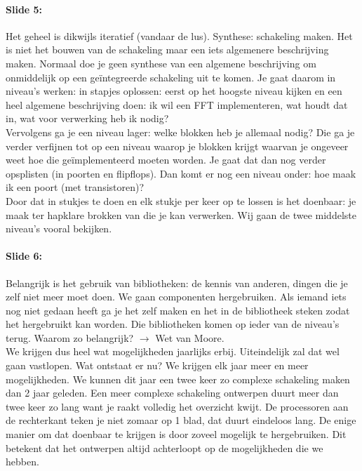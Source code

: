 \documentclass[10pt,a4paper]{book}
\begin{document}
\paragraph{Slide 5:} Het geheel is dikwijls iteratief (vandaar de lus). Synthese: schakeling maken. Het is niet het bouwen van de schakeling maar een iets algemenere beschrijving maken. Normaal doe je geen synthese van een algemene beschrijving om onmiddelijk op een ge\"integreerde schakeling uit te komen. Je gaat daarom in niveau's werken: in stapjes oplossen: eerst op het hoogste niveau kijken en een heel algemene beschrijving doen: ik wil een FFT implementeren, wat houdt dat in, wat voor verwerking heb ik nodig?\\ Vervolgens ga je een niveau lager: welke blokken heb je allemaal nodig? Die ga je verder verfijnen tot op een niveau waarop je blokken krijgt waarvan je ongeveer weet hoe die ge\"implementeerd moeten worden. Je gaat dat dan nog verder opsplisten (in poorten en flipflops). Dan komt er nog een niveau onder: hoe maak ik een poort (met transistoren)? \\
Door dat in stukjes te doen en elk stukje per keer op te lossen is het doenbaar: je maak ter hapklare brokken van die je kan verwerken. Wij gaan de twee middelste niveau's vooral bekijken. 

\paragraph{Slide 6:} Belangrijk is het gebruik van bibliotheken: de kennis van anderen, dingen die je zelf niet meer moet doen. We gaan componenten hergebruiken. Als iemand iets nog niet gedaan heeft ga je het zelf maken en het in de bibliotheek steken zodat het hergebruikt kan worden. Die bibliotheken komen op ieder van de niveau's terug. Waarom zo belangrijk? $\rightarrow$ Wet van Moore.\\
We krijgen dus heel wat mogelijkheden jaarlijks erbij. Uiteindelijk zal dat wel gaan vastlopen. Wat ontstaat er nu? We krijgen elk jaar meer en meer mogelijkheden. We kunnen dit jaar een twee keer zo complexe schakeling maken dan 2 jaar geleden. Een meer complexe schakeling ontwerpen duurt meer dan twee keer zo lang want je raakt volledig het overzicht kwijt. De processoren aan de rechterkant teken je niet zomaar op 1 blad, dat duurt eindeloos lang. De enige manier om dat doenbaar te krijgen is door zoveel mogelijk te hergebruiken. Dit betekent dat het ontwerpen altijd achterloopt op de mogelijkheden die we hebben. 
\end{document}
